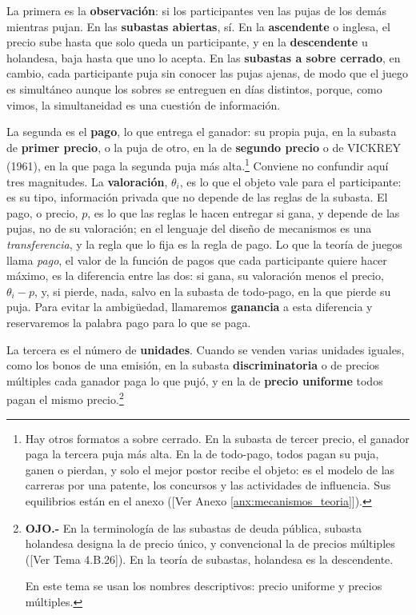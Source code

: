 \documentclass[10pt,a4paper]{article}
\newcommand{\authorfont}[1]{{\fontfamily{EBGaramond-TLF}\selectfont #1}}
\newcounter{anexo}
\begin{document}
La primera es la \textbf{observación}: si los participantes ven las pujas de los demás mientras pujan. En las \textbf{subastas abiertas}, sí. En la \textbf{ascendente} o inglesa, el precio sube hasta que solo queda un participante, y en la \textbf{descendente} u holandesa, baja hasta que uno lo acepta. En las \textbf{subastas a sobre cerrado}, en cambio, cada participante puja sin conocer las pujas ajenas, de modo que el juego es simultáneo aunque los sobres se entreguen en días distintos, porque, como vimos, la simultaneidad es una cuestión de información.

La segunda es el \textbf{pago}, lo que entrega el ganador: su propia puja, en la subasta de \textbf{primer precio}, o la puja de otro, en la de \textbf{segundo precio} o de VICKREY (1961), en la que paga la segunda puja más alta.\footnote{%
  Hay otros formatos a sobre cerrado. En la subasta de tercer precio, el ganador paga la tercera puja más alta. En la de todo-pago, todos pagan su puja, ganen o pierdan, y solo el mejor postor recibe el objeto: es el modelo de las carreras por una patente, los concursos y las actividades de influencia. Sus equilibrios están en el anexo ([\authorfont{Ver Anexo \ref{anx:mecanismos_teoria}}]).
} Conviene no confundir aquí tres magnitudes. La \textbf{valoración}, $\theta_i$, es lo que el objeto vale para el participante: es su tipo, información privada que no depende de las reglas de la subasta. El pago, o precio, $p$, es lo que las reglas le hacen entregar si gana, y depende de las pujas, no de su valoración; en el lenguaje del diseño de mecanismos es una \textit{transferencia}, y la regla que lo fija es la regla de pago. Lo que la teoría de juegos llama \textit{pago}, el valor de la función de pagos que cada participante quiere hacer máximo, es la diferencia entre las dos: si gana, su valoración menos el precio, $\theta_i-p$, y, si pierde, nada, salvo en la subasta de todo-pago, en la que pierde su puja. Para evitar la ambigüedad, llamaremos \textbf{ganancia} a esta diferencia y reservaremos la palabra pago para lo que se paga.

La tercera es el número de \textbf{unidades}. Cuando se venden varias unidades iguales, como los bonos de una emisión, en la subasta \textbf{discriminatoria} o de precios múltiples cada ganador paga lo que pujó, y en la de \textbf{precio uniforme} todos pagan el mismo precio.\footnote{%
  \textbf{OJO.-} En la terminología de las subastas de deuda pública, subasta holandesa designa la de precio único, y convencional la de precios múltiples ([\authorfont{Ver Tema 4.B.26}]). En la teoría de subastas, holandesa es la descendente.

  En este tema se usan los nombres descriptivos: precio uniforme y precios múltiples.
}
\end{document}
